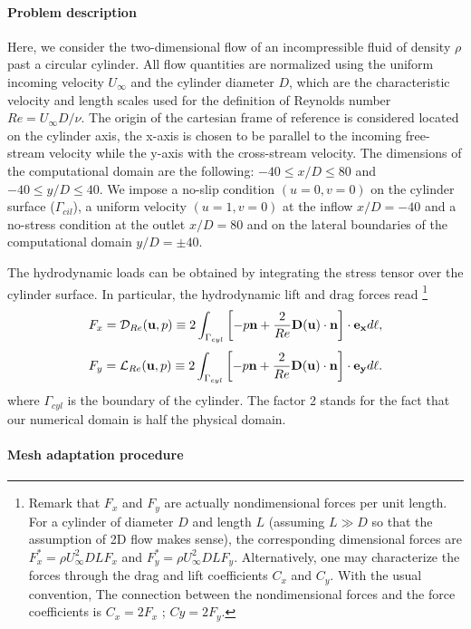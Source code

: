\documentclass[twocolumn,10pt]{asme2ej}
\newcommand{\be}[1]{ \begin{equation} \label{#1}}
\newcommand{\ee}{\end{equation}}
\begin{document}
\paragraph{Problem description}
Here, we consider the two-dimensional flow of an incompressible fluid of density $\rho$ past a circular cylinder. 
All flow quantities are normalized using the uniform incoming velocity $U_{\infty}$ and the cylinder diameter $D$, 
which are the characteristic velocity and length scales used for the definition of Reynolds number $Re= U_{\infty} D / \nu$.
The origin of the cartesian frame of reference is considered located on the cylinder axis, the x-axis is chosen to be parallel to the incoming free-stream velocity while the y-axis with the cross-stream velocity.
The dimensions of the computational domain are the following: $-40 \le x/D \le 80$ and $-40 \le y/D \le 40$.
We impose a no-slip condition $(u=0,v=0)$ on the cylinder surface (${\Gamma_{cil}}$), a uniform velocity $(u=1,v=0)$ at the inflow 
$x/D=-40$ and a no-stress condition at the outlet $x/D=80$ and on the lateral boundaries of the computational domain $y/D=\pm 40$.

The hydrodynamic loads can be obtained by integrating the stress tensor over the cylinder surface.
In particular, the hydrodynamic lift and drag forces read
\footnote{ Remark that $F_x$ and $F_y$ are actually nondimensional forces per unit length. 
For a cylinder of diameter $D$ and length $L$ (assuming $L\gg D$ so that the assumption of 2D flow makes sense), 
the corresponding dimensional forces are $F_x^* = \rho U_\infty^2 D L F_x $ and $F_y^* = \rho U_\infty^2 D L F_y$. 
Alternatively, one may characterize the forces through the drag and lift coefficients $C_x$ and $C_y$. With the usual convention, 
The connection between the nondimensional forces and the force coefficients is $C_x = 2 F_x$ ; $Cy = 2 F_y$.
}
\be{drag}
F_x = {\cal D}_{Re} ({\bf u},p) \equiv 
 2 \int_{\Gamma_{cyl}} \left[-p {\bf n} + \frac{2}{Re} {\bf D}({\bf u}) \cdot {\bf n} \right]   \cdot {\bf e_x} d\ell,
\ee
\be{lift}
F_y = {\cal L}_{Re} ({\bf u},p) \equiv
 2 \int_{\Gamma_{cyl}} \left[-p {\bf n} + \frac{2}{Re} {\bf D}({\bf u}) \cdot {\bf n} \right]   \cdot {\bf e_y} d\ell. 
\ee
where $\Gamma_{cyl}$ is the boundary of the cylinder. The factor 2 stands for the fact that our numerical domain is half the physical domain.


\paragraph{Mesh adaptation procedure}
\end{document}
